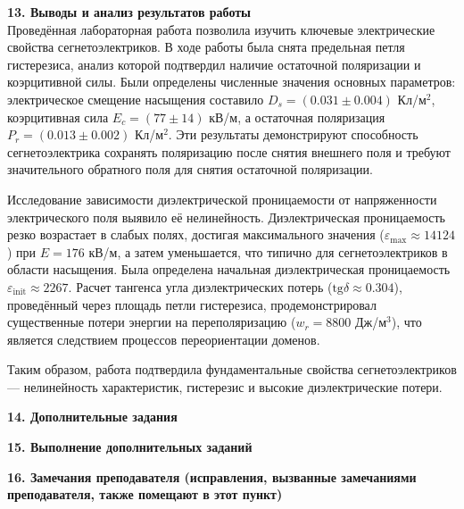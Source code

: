 \documentclass[12pt,fleqn]{article}
\begin{document}
\begin{justify}
    \textbf{13. Выводы и анализ результатов работы} \\
    
    Проведённая лабораторная работа позволила изучить ключевые электрические свойства сегнетоэлектриков. В ходе работы была снята предельная петля гистерезиса, анализ которой подтвердил наличие остаточной поляризации и коэрцитивной силы. Были определены численные значения основных параметров: электрическое смещение насыщения составило $D_s = (0.031 \pm 0.004)$ Кл/м$^2$, коэрцитивная сила $E_c = (77 \pm 14)$ кВ/м, а остаточная поляризация $P_r = (0.013 \pm 0.002)$ Кл/м$^2$. Эти результаты демонстрируют способность сегнетоэлектрика сохранять поляризацию после снятия внешнего поля и требуют значительного обратного поля для снятия остаточной поляризации.

    Исследование зависимости диэлектрической проницаемости от напряженности электрического поля выявило её нелинейность. Диэлектрическая проницаемость резко возрастает в слабых полях, достигая максимального значения ($\varepsilon_{\max} \approx 14124$) при $E = 176$ кВ/м, а затем уменьшается, что типично для сегнетоэлектриков в области насыщения. Была определена начальная диэлектрическая проницаемость $\varepsilon_{\text{init}} \approx 2267$. Расчет тангенса угла диэлектрических потерь ($\text{tg}\delta \approx 0.304$), проведённый через площадь петли гистерезиса, продемонстрировал существенные потери энергии на переполяризацию ($w_r = 8800$ Дж/м$^3$), что является следствием процессов переориентации доменов.

    Таким образом, работа подтвердила фундаментальные свойства сегнетоэлектриков --- нелинейность характеристик, гистерезис и высокие диэлектрические потери.
\end{justify}

\begin{justify}
    \textbf{14. Дополнительные задания}
\end{justify}

\begin{justify}
    \textbf{15. Выполнение дополнительных заданий}
\end{justify}

\begin{justify}
    \textbf{16. Замечания преподавателя (исправления, вызванные замечаниями преподавателя, также помещают в этот пункт)}
\end{justify}
\end{document}
